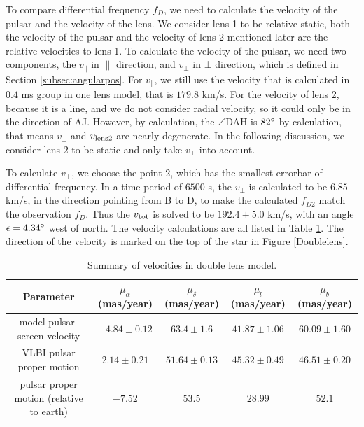\documentclass[useAMS,usenatbib]{mn2e}
\begin{document}
To compare differential frequency $f_D$, we need to calculate the velocity of the pulsar and the velocity of the lens. We consider lens 1 to be relative static, both the velocity of the pulsar and the velocity of lens 2 mentioned later are the relative velocities to lens 1.
To calculate the velocity of the pulsar, we need two components, the $v_{\parallel}$ in ${\parallel}$ direction, and $v_{\bot}$ in ${\bot}$ direction, which is defined in Section \ref{subsec:angularpos}. For $v_{\parallel}$, we still use the velocity that is calculated in $0.4$ ms group in one lens model, that is $179.8$ km/s. For the velocity of lens 2, because it is a line, and we do not consider radial velocity, so it could only be in the direction of AJ. However, by calculation, the $\angle$DAH is $82\degree$ by calculation, that means $v_{\bot}$ and $v_{\rm lens2}$ are nearly degenerate. In the following discussion, we consider lens 2 to be static and only take $v_{\bot}$ into account.

To calculate $v_{\bot}$, we choose the point 2, which has the smallest errorbar of differential frequency. In a time period of $6500$ s, the $v_{\bot}$ is calculated to be $6.85$ km/s, in the direction pointing from B to D, to make the calculated $f_{D2}$ match the observation $f_D$. Thus the $v_{\rm tot}$ is solved to be $192.4\pm 5.0$ km/s, with an angle $\epsilon=4.34\degree$ west of north. The velocity calculations are all listed in Table \ref{Table:velocity}. The direction of the velocity is marked on the top of the star in Figure \ref{Doublelens}.

\begin{table}
\centering
\begin{tabular}{ccccc}
\hline
Parameter & $\mu_{\alpha}$(mas/year) & $\mu_{\delta}$(mas/year) & $\mu_{l}$(mas/year) & $\mu_b$ (mas/year)\\
\hline
model pulsar-screen velocity & $-4.84\pm 0.12$ & $63.4\pm 1.6$ & $41.87\pm 1.06$ & $60.09\pm 1.60$ \\
VLBI pulsar proper motion & $2.14 \pm 0.21$ & $51.64\pm 0.13$ & $45.32\pm 0.49$ & $46.51 \pm 0.20$\\
pulsar proper motion (relative to earth) & $-7.52$ &  $53.5$ & $28.99$  & $52.1$ \\
\hline
\end{tabular}
\caption{Summary of velocities in double lens model.}
\label{Table:velocity}
\end{table}
\end{document}
